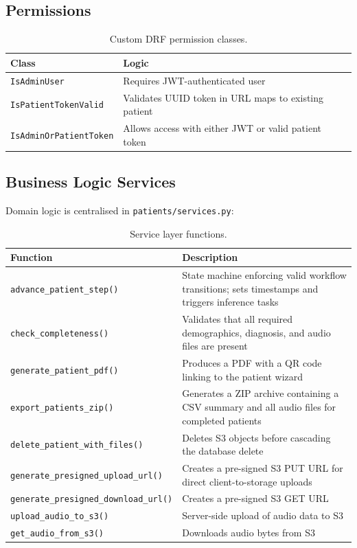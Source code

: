 \documentclass[12pt,a4paper]{article}
\begin{document}
\subsection{Permissions}

\begin{table}[H]
\centering
\caption{Custom DRF permission classes.}
\begin{tabularx}{\textwidth}{l X}
\toprule
\textbf{Class} & \textbf{Logic} \\
\midrule
\texttt{IsAdminUser}          & Requires JWT-authenticated user \\
\texttt{IsPatientTokenValid}  & Validates UUID token in URL maps to existing patient \\
\texttt{IsAdminOrPatientToken}& Allows access with either JWT or valid patient token \\
\bottomrule
\end{tabularx}
\end{table}

\subsection{Business Logic Services}
\label{sec:services}

Domain logic is centralised in \texttt{patients/services.py}:

\begin{table}[H]
\centering
\caption{Service layer functions.}
\label{tab:services}
\begin{tabularx}{\textwidth}{l X}
\toprule
\textbf{Function} & \textbf{Description} \\
\midrule
\texttt{advance\_patient\_step()} & State machine enforcing valid workflow transitions; sets timestamps and triggers inference tasks \\
\texttt{check\_completeness()}    & Validates that all required demographics, diagnosis, and audio files are present \\
\texttt{generate\_patient\_pdf()} & Produces a PDF with a QR code linking to the patient wizard \\
\texttt{export\_patients\_zip()}  & Generates a ZIP archive containing a CSV summary and all audio files for completed patients \\
\texttt{delete\_patient\_with\_files()} & Deletes S3 objects before cascading the database delete \\
\texttt{generate\_presigned\_upload\_url()} & Creates a pre-signed S3 PUT URL for direct client-to-storage uploads \\
\texttt{generate\_presigned\_download\_url()} & Creates a pre-signed S3 GET URL \\
\texttt{upload\_audio\_to\_s3()}  & Server-side upload of audio data to S3 \\
\texttt{get\_audio\_from\_s3()}   & Downloads audio bytes from S3 \\
\bottomrule
\end{tabularx}
\end{table}
\end{document}
